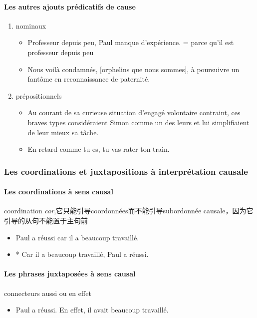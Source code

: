 \documentclass[UTF8]{report}
\begin{document}
\paragraph{Les autres ajouts prédicatifs de cause}
\begin{enumerate}
    \item nominaux
    \begin{itemize}
        \item Professeur depuis peu, Paul manque d’expérience. = parce qu’il est professeur depuis peu
        \item Nous voilà condamnés, [orphelins que nous sommes], à poursuivre un fantôme en reconnaissance de paternité. 
    \end{itemize}
    \item prépositionnels
    \begin{itemize}
        \item Au courant de sa curieuse situation d’engagé volontaire contraint, ces braves types considéraient Simon comme un des leurs et lui simplifiaient de leur mieux sa tâche.
        \item En retard comme tu es, tu vas rater ton train.
    \end{itemize}
\end{enumerate}


\subsubsection{Les coordinations et juxtapositions à interprétation causale}
\paragraph{Les coordinations à sens causal}
coordination \textit{car},它只能引导coordonnées而不能引导subordonnée causale，因为它引导的从句不能置于主句前
\begin{itemize}
    \item Paul a réussi car il a beaucoup travaillé.
    \item * Car il a beaucoup travaillé, Paul a réussi.
\end{itemize}

\paragraph{Les phrases juxtaposées à sens causal}
connecteurs aussi ou en effet 
\begin{itemize}
    \item Paul a réussi. En effet, il avait beaucoup travaillé.
\end{itemize}
\end{document}

